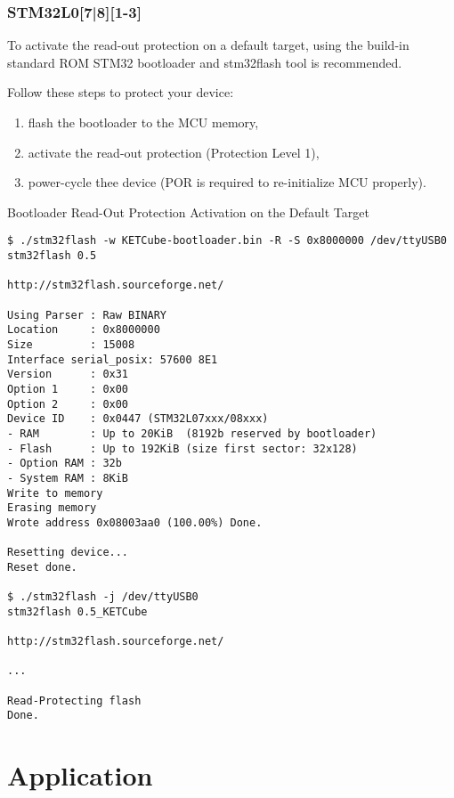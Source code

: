 
\subsubsection{STM32L0[7|8][1-3]}

To activate the read-out protection on a default target, using the build-in standard ROM STM32 bootloader and stm32flash tool is recommended.

Follow these steps to protect your device:
\begin{enumerate}
  \item flash the bootloader to the MCU memory,
  \item activate the read-out protection (Protection Level 1),
  \item power-cycle thee device (POR is required to re-initialize MCU properly).
\end{enumerate}

\begin{docCodeExampleTitled}{Bootloader Read-Out Protection Activation on the Default Target}
\begin{verbatim}
$ ./stm32flash -w KETCube-bootloader.bin -R -S 0x8000000 /dev/ttyUSB0
stm32flash 0.5

http://stm32flash.sourceforge.net/

Using Parser : Raw BINARY
Location     : 0x8000000
Size         : 15008
Interface serial_posix: 57600 8E1
Version      : 0x31
Option 1     : 0x00
Option 2     : 0x00
Device ID    : 0x0447 (STM32L07xxx/08xxx)
- RAM        : Up to 20KiB  (8192b reserved by bootloader)
- Flash      : Up to 192KiB (size first sector: 32x128)
- Option RAM : 32b
- System RAM : 8KiB
Write to memory
Erasing memory
Wrote address 0x08003aa0 (100.00%) Done.

Resetting device... 
Reset done.

$ ./stm32flash -j /dev/ttyUSB0 
stm32flash 0.5_KETCube

http://stm32flash.sourceforge.net/

...

Read-Protecting flash
Done.
\end{verbatim}
\end{docCodeExampleTitled}
   
\clearpage
\section{Application}\label{sec:app}


